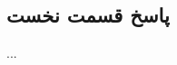 \documentclass[12pt,a4paper]{article}
\begin{document}
\subsection*{پاسخ قسمت نخست}

...
\end{document}
